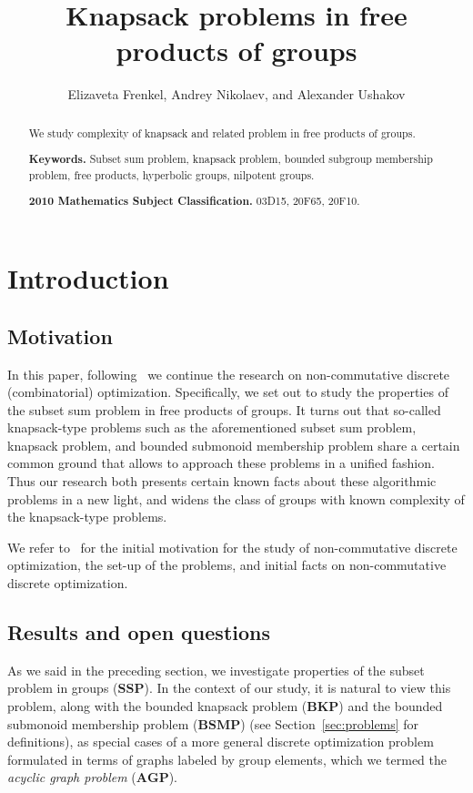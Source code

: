 \documentclass[10pt]{amsart}
\title{Knapsack problems in free products of groups}
\author[]{Elizaveta Frenkel, Andrey Nikolaev, and Alexander Ushakov}
\theoremstyle{definition}
\def\SSP{{\mathbf{SSP}}}
\def\BSMP{{\mathbf{BSMP}}}
\def\BKP{{\mathbf{BKP}}}
\def\AGP{{\mathbf{AGP}}}
\begin{document}
\maketitle

\begin{abstract}
We study complexity of knapsack and related problem in free products of groups.

\noindent
{\bf Keywords.} Subset sum problem,  knapsack problem, bounded subgroup membership problem, free products, hyperbolic groups, nilpotent groups.

\noindent
{\bf 2010 Mathematics Subject Classification.} 03D15, 20F65, 20F10.
\end{abstract}

\tableofcontents

\section{Introduction}\label{sec:intro}


\subsection{Motivation}\label{sub:motivation}
In this paper, following~\cite{MNU1}  we continue the research on  non-commutative discrete (combinatorial) optimization. Specifically, we set out to study the properties of the subset sum problem in free products of groups. It turns out that so-called knapsack-type problems such as the aforementioned subset sum problem, knapsack problem, and bounded submonoid membership problem share a certain common ground that allows to approach these problems in a unified fashion. Thus our research both presents certain known facts about these algorithmic problems in a new light, and widens the class of groups with known complexity of the knapsack-type problems.

We refer to~\cite{MNU1,MNU2} for the initial motivation for the study of non-commutative discrete optimization, the set-up of the problems, and initial facts on non-commutative discrete optimization.

\subsection{Results and open questions}\label{sub:results}
As we said in the preceding section, we investigate properties of the subset problem in groups ($\SSP$). In the context of our study, it is natural to view this problem, along with the bounded knapsack problem ($\BKP$) and the bounded submonoid membership problem ($\BSMP$) (see Section~\ref{sec:problems} for definitions), as special cases of a more general discrete optimization problem formulated in terms of graphs labeled by group elements, which we termed the {\em acyclic graph problem} ($\AGP$).
\end{document}

